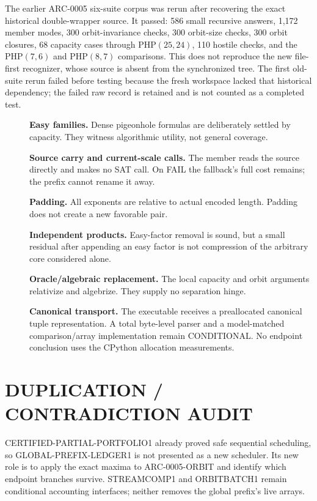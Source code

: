 \documentclass[11pt]{article}
\begin{document}
The earlier ARC-0005 six-suite corpus was rerun after recovering the exact
historical double-wrapper source.  It passed: 586 small recursive answers,
1,172 member modes, 300 orbit-invariance checks, 300 orbit-size checks, 300
orbit closures, 68 capacity cases through PHP$(25,24)$, 110 hostile checks,
and the PHP$(7,6)$ and PHP$(8,7)$ comparisons.  This does not reproduce the
new file-first recognizer, whose source is absent from the synchronized tree.
The first old-suite rerun failed before testing because the fresh workspace
lacked that historical dependency; the
failed raw record is retained and is not counted as a completed test.

\begin{description}
\item[] \textbf{Easy families.}  Dense pigeonhole formulas are deliberately
settled by capacity.  They witness algorithmic utility, not general coverage.
\item[] \textbf{Source carry and current-scale calls.}  The member reads the
source directly and makes no SAT call.  On FAIL the fallback's full cost
remains; the prefix cannot rename it away.
\item[] \textbf{Padding.}  All exponents are relative to actual encoded
length.  Padding does not create a new favorable pair.
\item[] \textbf{Independent products.}  Easy-factor removal is sound, but a
small residual after appending an easy factor is not compression of the
arbitrary core considered alone.
\item[] \textbf{Oracle/algebraic replacement.}  The local capacity and orbit
arguments relativize and algebrize.  They supply no separation hinge.
\item[] \textbf{Canonical transport.}  The executable receives a preallocated
canonical tuple representation.  A total byte-level parser and a
model-matched comparison/array implementation remain CONDITIONAL.  No
endpoint conclusion uses the CPython allocation measurements.
\end{description}

\section{DUPLICATION / CONTRADICTION AUDIT}
CERTIFIED-PARTIAL-PORTFOLIO1 already proved safe sequential scheduling, so
GLOBAL-PREFIX-LEDGER1 is not presented as a new scheduler.  Its new role is to
apply the exact maxima to ARC-0005-ORBIT and identify which endpoint branches
survive.  STREAMCOMP1 and ORBITBATCH1 remain conditional accounting
interfaces; neither removes the global prefix's live arrays.
\end{document}
